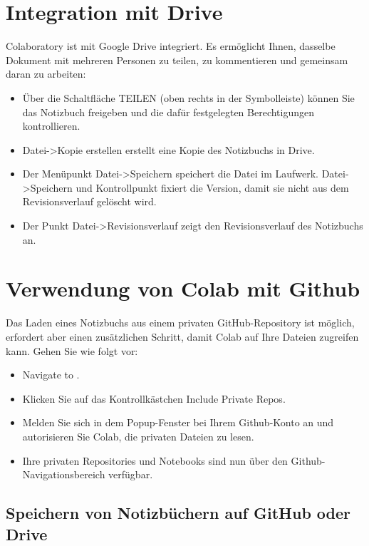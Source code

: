 \section{Integration mit Drive}

Colaboratory ist mit Google Drive integriert. Es ermöglicht Ihnen, dasselbe Dokument mit mehreren Personen zu teilen, zu kommentieren und gemeinsam daran zu arbeiten:

\begin{itemize}
	\item Über die Schaltfläche TEILEN (oben rechts in der Symbolleiste) können Sie das Notizbuch freigeben und die dafür festgelegten Berechtigungen kontrollieren.
	\item Datei->Kopie erstellen erstellt eine Kopie des Notizbuchs in Drive.
	\item Der Menüpunkt Datei->Speichern speichert die Datei im Laufwerk. Datei->Speichern und Kontrollpunkt fixiert die Version, damit sie nicht aus dem Revisionsverlauf gelöscht wird.
	\item Der Punkt Datei->Revisionsverlauf zeigt den Revisionsverlauf des Notizbuchs an.
\end{itemize}

\section{Verwendung von Colab mit Github}

Das Laden eines Notizbuchs aus einem privaten GitHub-Repository ist möglich, erfordert aber einen zusätzlichen Schritt, damit Colab auf Ihre Dateien zugreifen kann. Gehen Sie wie folgt vor:

\begin{itemize}
	\item Navigate to .
	\item Klicken Sie auf das Kontrollkästchen \glqq Include Private Repos\grqq.
	\item Melden Sie sich in dem Popup-Fenster bei Ihrem Github-Konto an und autorisieren Sie Colab, die privaten Dateien zu lesen.
	\item Ihre privaten Repositories und Notebooks sind nun über den Github-Navigationsbereich verfügbar.
\end{itemize}

\subsection{Speichern von Notizbüchern auf GitHub oder Drive}

